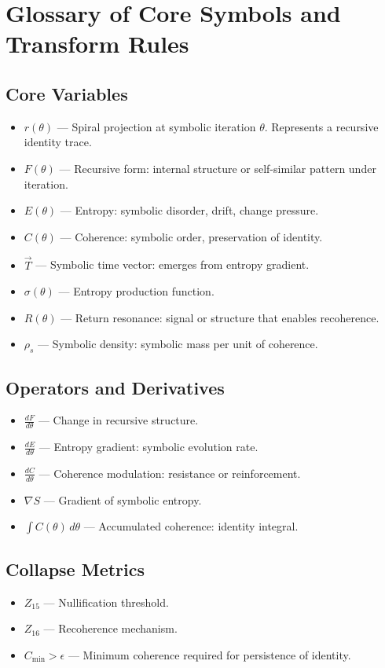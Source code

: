 \documentclass[12pt]{article}
\begin{document}
\section{Glossary of Core Symbols and Transform Rules}

\subsection*{Core Variables}
\begin{itemize}
  \item $r(\theta)$ — Spiral projection at symbolic iteration $\theta$. Represents a recursive identity trace.
  \item $F(\theta)$ — Recursive form: internal structure or self-similar pattern under iteration.
  \item $E(\theta)$ — Entropy: symbolic disorder, drift, change pressure.
  \item $C(\theta)$ — Coherence: symbolic order, preservation of identity.
  \item $\vec{T}$ — Symbolic time vector: emerges from entropy gradient.
  \item $\sigma(\theta)$ — Entropy production function.
  \item $R(\theta)$ — Return resonance: signal or structure that enables recoherence.
  \item $\rho_s$ — Symbolic density: symbolic mass per unit of coherence.
\end{itemize}

\subsection*{Operators and Derivatives}
\begin{itemize}
  \item $\frac{dF}{d\theta}$ — Change in recursive structure.
  \item $\frac{dE}{d\theta}$ — Entropy gradient: symbolic evolution rate.
  \item $\frac{dC}{d\theta}$ — Coherence modulation: resistance or reinforcement.
  \item $\nabla S$ — Gradient of symbolic entropy.
  \item $\int C(\theta) \, d\theta$ — Accumulated coherence: identity integral.
\end{itemize}

\subsection*{Collapse Metrics}
\begin{itemize}
  \item $Z_{15}$ — Nullification threshold.
  \item $Z_{16}$ — Recoherence mechanism.
  \item $C_{\text{min}} > \epsilon$ — Minimum coherence required for persistence of identity.
\end{itemize}
\end{document}
